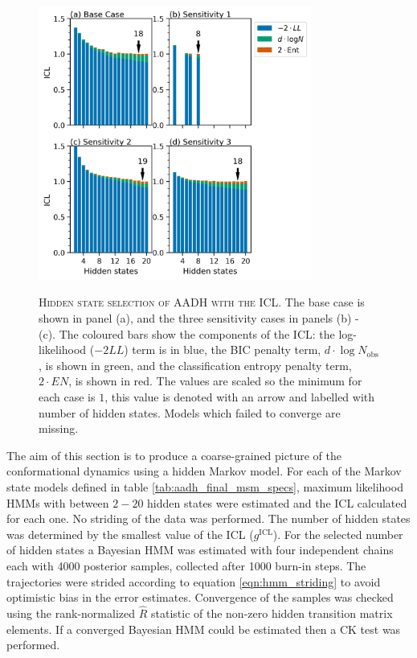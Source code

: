 \begin{figure}
    \centering
    \caption[Hidden state selection of AADH with the ICL]{\textsc{Hidden state selection of AADH with the ICL}. The base case is shown in panel (a), and the three sensitivity cases  in panels (b) - (c).  The coloured bars show the components of the ICL: the log-likelihood ($-2LL$) term is in blue, the BIC penalty term,  $d\cdot\log{N_{\mathrm{obs}}}$, is shown in green, and the classification entropy penalty term, $2\cdot EN$, is shown in red. The values are scaled so the minimum for each case is $1$, this value is denoted with an arrow and labelled  with number of hidden states. Models which failed to converge are missing.}
    \includegraphics[width=0.8\textwidth]{chapters/aadh/figures/aadh_h_state_selection.png}
    \label{fig:aadh_h_selection_results}
\end{figure}

The aim of this section is to produce a coarse-grained picture of the conformational dynamics using a hidden Markov model. For each of the Markov state models defined in table \ref{tab:aadh_final_msm_specs}, maximum likelihood HMMs with between $2 - 20$ hidden states were estimated and the ICL calculated for each one. No striding of the data was performed. The number of hidden states was determined by the smallest value of the ICL ($g^{\mathrm{ICL}}$). For the selected number of hidden states a Bayesian HMM was estimated with four independent chains each with \num{4000} posterior samples, collected after \num{1000} burn-in steps. The trajectories were strided according to equation \ref{eqn:hmm_striding} to avoid optimistic bias in the error estimates\cite{trendelkamp-schroerEstimationUncertaintyReversible2015b}. Convergence of the samples was checked using the rank-normalized $\hat{R}$ statistic\cite{vehtariRanknormalizationFoldingLocalization2020} of the non-zero hidden transition matrix elements. If a converged Bayesian HMM could be estimated then a CK test was performed. 

